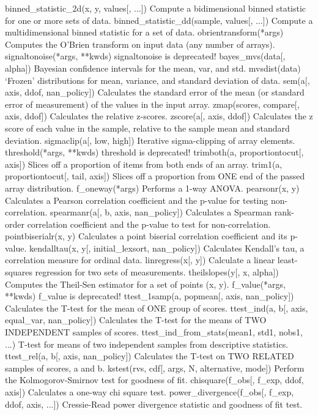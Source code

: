 binned_statistic_2d(x, y, values[, ...])	Compute a bidimensional binned statistic for one or more sets of data.
binned_statistic_dd(sample, values[, ...])	Compute a multidimensional binned statistic for a set of data.
obrientransform(*args)	Computes the O’Brien transform on input data (any number of arrays).
signaltonoise(*args, **kwds)	signaltonoise is deprecated!
bayes_mvs(data[, alpha])	Bayesian confidence intervals for the mean, var, and std.
mvsdist(data)	‘Frozen’ distributions for mean, variance, and standard deviation of data.
sem(a[, axis, ddof, nan_policy])	Calculates the standard error of the mean (or standard error of measurement) of the values in the input array.
zmap(scores, compare[, axis, ddof])	Calculates the relative z-scores.
zscore(a[, axis, ddof])	Calculates the z score of each value in the sample, relative to the sample mean and standard deviation.
sigmaclip(a[, low, high])	Iterative sigma-clipping of array elements.
threshold(*args, **kwds)	threshold is deprecated!
trimboth(a, proportiontocut[, axis])	Slices off a proportion of items from both ends of an array.
trim1(a, proportiontocut[, tail, axis])	Slices off a proportion from ONE end of the passed array distribution.
f_oneway(*args)	Performs a 1-way ANOVA.
pearsonr(x, y)	Calculates a Pearson correlation coefficient and the p-value for testing non-correlation.
spearmanr(a[, b, axis, nan_policy])	Calculates a Spearman rank-order correlation coefficient and the p-value to test for non-correlation.
pointbiserialr(x, y)	Calculates a point biserial correlation coefficient and its p-value.
kendalltau(x, y[, initial_lexsort, nan_policy])	Calculates Kendall’s tau, a correlation measure for ordinal data.
linregress(x[, y])	Calculate a linear least-squares regression for two sets of measurements.
theilslopes(y[, x, alpha])	Computes the Theil-Sen estimator for a set of points (x, y).
f_value(*args, **kwds)	f_value is deprecated!
ttest_1samp(a, popmean[, axis, nan_policy])	Calculates the T-test for the mean of ONE group of scores.
ttest_ind(a, b[, axis, equal_var, nan_policy])	Calculates the T-test for the means of TWO INDEPENDENT samples of scores.
ttest_ind_from_stats(mean1, std1, nobs1, ...)	T-test for means of two independent samples from descriptive statistics.
ttest_rel(a, b[, axis, nan_policy])	Calculates the T-test on TWO RELATED samples of scores, a and b.
kstest(rvs, cdf[, args, N, alternative, mode])	Perform the Kolmogorov-Smirnov test for goodness of fit.
chisquare(f_obs[, f_exp, ddof, axis])	Calculates a one-way chi square test.
power_divergence(f_obs[, f_exp, ddof, axis, ...])	Cressie-Read power divergence statistic and goodness of fit test.
